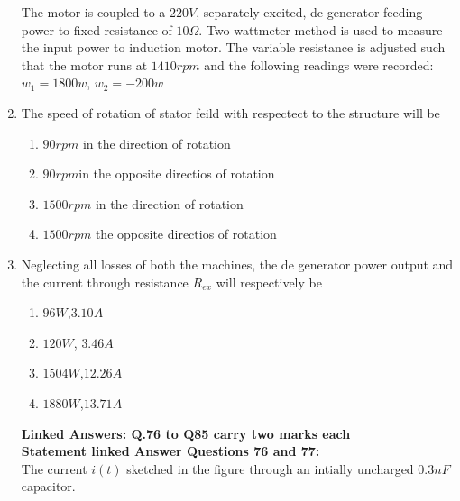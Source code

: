 \documentclass[journal]{IEEEtran}
\begin{document}
\begin{enumerate}
\begin{figure}[!ht]
\label{fig:my_label}
\end{figure}

The motor is coupled to a $220 V$, separately excited, dc generator feeding power to fixed resistance of $10\Omega$. Two-wattmeter method is used to measure the input power to induction motor. The variable resistance is adjusted such that the motor runs at $1410 rpm$ and the following readings were recorded:\\
$w_1=1800w$, $w_2=-200w$\\
\item The speed of rotation of stator feild with respectect to the structure will be 
\begin{enumerate}
    \item $90 rpm$ in the direction of rotation 
    \item $90 rpm$in the opposite directios of rotation 
    \item $1500 rpm$ in the direction of rotation 
    \item $1500 rpm$ the opposite directios of rotation 
\end{enumerate}
\item Neglecting all losses of both the machines, the de generator power output and the current through resistance $R_{ex}$ will respectively be
\begin{enumerate}
    \item $96 W$,$3.10 A$
    \item $120 W$, $3.46 A$
    \item $1504W$,$12.26 A$
    \item $1880W$,$13.71 A$
\end{enumerate}
\textbf{Linked Answers: Q.76 to Q85 carry two marks each}\\
\textbf{Statement linked Answer Questions 76 and 77:}\\
The current $i(t)$ sketched in the figure through an intially uncharged $0.3 nF$ capacitor.
\begin{figure}[!ht]
\centering
{}
\end{figure}
\end{enumerate}
\end{document}
